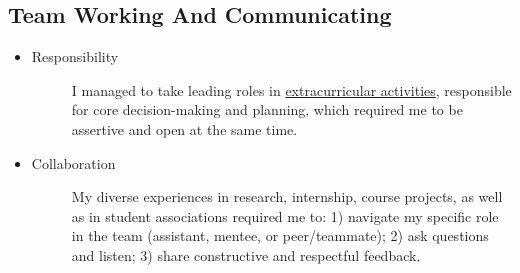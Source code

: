 \documentclass[a4paper]{article}
\begin{document}
\subsection{Team Working And Communicating}
\begin{itemize}
    \item\begin{description}
        \item[Responsibility]
        I managed to take leading roles in \hyperlink{extra}{extracurricular activities}, responsible for core decision-making and planning, which required me to be assertive and open at the same time.
    \end{description}
    \item\begin{description}
        \item[Collaboration]
        My diverse experiences in research, internship, course projects, as well as in student associations required me to: 1) navigate my specific role in the team (assistant, mentee, or peer/teammate); 2) ask questions and listen; 3) share constructive and respectful feedback.
    \end{description}
\end{itemize}
\end{document}
